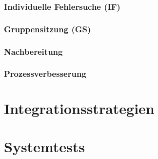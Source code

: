 \documentclass[a4paper]{article}
\theoremstyle{break}
\begin{document}
          \subsubsection{Individuelle Fehlersuche (IF)}
\subsubsection{Gruppensitzung (GS)}
\subsubsection{Nachbereitung}
\subsubsection{Prozessverbesserung}
\section{Integrationsstrategien}
\section{Systemtests}
\end{document}
